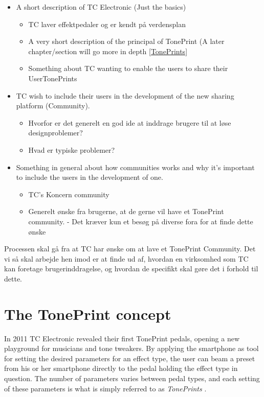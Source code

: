 \begin{itemize}
	\item A short description of TC Electronic (Just the basics)
	
	\begin{itemize}
		\item TC laver effektpedaler og er kendt på verdensplan
		\item  A very short description of the principal of TonePrint (A later chapter/section will go more in depth \autoref{TonePrints}
		\item Something about TC wanting to enable the users to share their UserTonePrints
	\end{itemize}
	
	\item TC wish to include their users in the development of the new sharing platform (Community).
	
	\begin{itemize}
		\item Hvorfor er det generelt en god ide at inddrage brugere til at løse designproblemer?
		\item Hvad er typiske problemer?
	\end{itemize}
	
	\item Something in general about how communities works and why it's important to include the users in the development of one.	
	
	\begin{itemize}
		\item TC's Koncern community
		\item Generelt ønske fra brugerne, at de gerne vil have et TonePrint community. - Det kræver kun et besøg på diverse fora for at finde dette ønske
	\end{itemize}

\end{itemize}


Processen skal gå fra at TC har ønske om at lave et TonePrint Community. Det vi så skal arbejde hen imod er at finde ud af, hvordan en virksomhed som TC kan foretage brugerinddragelse, og hvordan de specifikt skal gøre det i forhold til dette.




\section{The TonePrint concept}
\label{TonePrints}
In 2011 TC Electronic revealed their first TonePrint pedals, opening a new playground for musicians and tone tweakers. By applying the smartphone as tool for setting the desired parameters for an effect type, the user can beam a preset from his or her smartphone directly to the pedal holding the effect type in question. The number of parameters varies between pedal types, and each setting of these parameters is what is simply referred to as \textit{TonePrints} \parencite{WEB:AboutTonePrints}.

